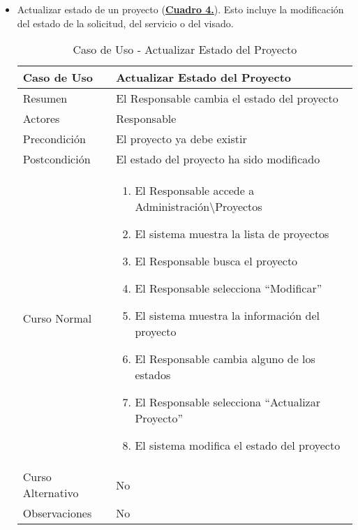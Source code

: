 \begin{itemize}
  \newpage~
	\item \addtocounter{tabla}{1} Actualizar estado de un proyecto (\textbf{\hyperref[tab:curActualizarProyecto]{Cuadro 4.}}). Esto incluye la modificación del estado de la solicitud, del servicio o del visado.
		\begin{table}[!htbp]
		  \centering  \addtocounter{casouso}{1}
		  \begin{tabular}{|l | p{100mm}|}
		    \textbf{Caso de Uso}  & \textbf{Actualizar Estado del Proyecto} \\ \hline
		    Resumen 		 & El Responsable cambia el estado del proyecto \\ \hline
		    Actores  		 & Responsable \\ \hline
		    Precondición  	 & El proyecto ya debe existir  \\ \hline
		    Postcondición  	 & El estado del proyecto ha sido modificado \\ \hline
		    Curso Normal   	 & \begin{enumerate}
			  \item El Responsable accede a Administración\textbackslash Proyectos
			  \item El sistema muestra la lista de proyectos
			  \item El Responsable busca el proyecto
			  \item El Responsable selecciona ``Modificar''
			  \item El sistema muestra la información del proyecto
			  \item El Responsable cambia alguno de los estados
			  \item El Responsable selecciona ``Actualizar Proyecto''
			  \item El sistema modifica el estado del proyecto
		    \end{enumerate}  \\ \hline
		    Curso Alternativo  & No  \\ \hline
		    Observaciones 	 & No  \\ \hline
		  \end{tabular}
		  \caption{Caso de Uso  - Actualizar Estado del Proyecto}
		  \label{tab:curActualizarProyecto}
		\end{table}
		\FloatBarrier


\end{itemize}
